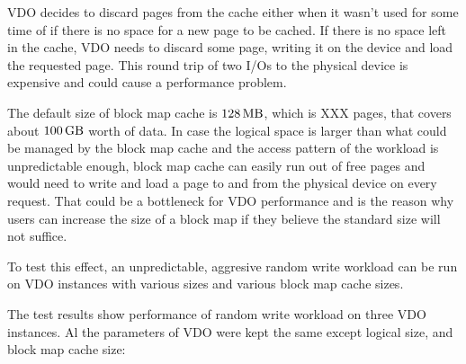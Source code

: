 \documentclass[
  color, %
  table, %
  lof,   %
  lot,   %
]{fithesis3}
\begin{document}
VDO decides to discard pages from the cache either when it wasn't used for some time of if there is no space for a new page to be cached. If there is no space left in the cache, VDO needs to discard some page, writing it on the device and load the requested page. This round trip of two I/Os to the physical device is expensive and could cause a performance problem.

The default size of block map cache is $\SI{128}{\mega\byte}$, which is XXX pages, that covers about $\SI{100}{\giga\byte}$ worth of data. In case the logical space is larger than what could be managed by the block map cache and the access pattern of the workload is unpredictable enough, block map cache can easily run out of free pages and would need to write and load a page to and from the physical device on every request. That could be a bottleneck for VDO performance and is the reason why users can increase the size of a block map if they believe the standard size will not suffice.

To test this effect, an unpredictable, aggresive random write workload can be run on VDO instances with various sizes and various block map cache sizes.

The test results show performance of random write workload on three VDO instances. Al the parameters of VDO were kept the same except logical size, and block map cache size:




\end{document}
